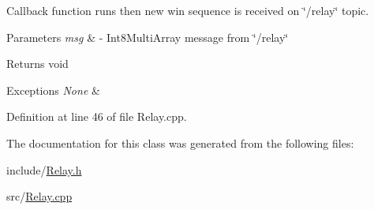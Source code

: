 Callback function runs then new win sequence is received on \char`\"{}/relay\char`\"{} topic. 


\begin{DoxyParams}{Parameters}
{\em msg} & -\/ Int8\+Multi\+Array message from \char`\"{}/relay\char`\"{} \\
\hline
\end{DoxyParams}
\begin{DoxyReturn}{Returns}
void 
\end{DoxyReturn}

\begin{DoxyExceptions}{Exceptions}
{\em None} & \\
\hline
\end{DoxyExceptions}


Definition at line 46 of file Relay.\+cpp.



The documentation for this class was generated from the following files\+:\begin{DoxyCompactItemize}
\item 
include/\hyperlink{Relay_8h}{Relay.\+h}\item 
src/\hyperlink{Relay_8cpp}{Relay.\+cpp}\end{DoxyCompactItemize}
